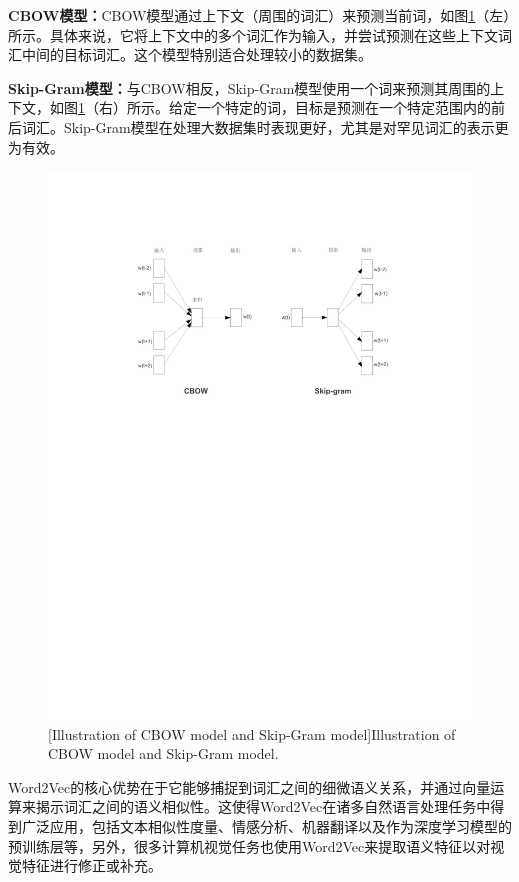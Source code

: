 \textbf{CBOW模型：}CBOW模型通过上下文（周围的词汇）来预测当前词，如图\ref{figure2: Word2Vec}（左）所示。具体来说，它将上下文中的多个词汇作为输入，并尝试预测在这些上下文词汇中间的目标词汇。这个模型特别适合处理较小的数据集。

\textbf{Skip-Gram模型：}与CBOW相反，Skip-Gram模型使用一个词来预测其周围的上下文，如图\ref{figure2: Word2Vec}（右）所示。给定一个特定的词，目标是预测在一个特定范围内的前后词汇。Skip-Gram模型在处理大数据集时表现更好，尤其是对罕见词汇的表示更为有效。

\begin{figure}[h!]
\centering
{}
\includegraphics[width=1.0\columnwidth]{figures/RelatedWork/Word2Vec.pdf}
[Illustration of CBOW model and Skip-Gram model]{Illustration of CBOW model and Skip-Gram model.}
\label{figure2: Word2Vec}
\end{figure}

Word2Vec的核心优势在于它能够捕捉到词汇之间的细微语义关系，并通过向量运算来揭示词汇之间的语义相似性。这使得Word2Vec在诸多自然语言处理任务中得到广泛应用，包括文本相似性度量、情感分析、机器翻译以及作为深度学习模型的预训练层等，另外，很多计算机视觉任务也使用Word2Vec来提取语义特征以对视觉特征进行修正或补充。

